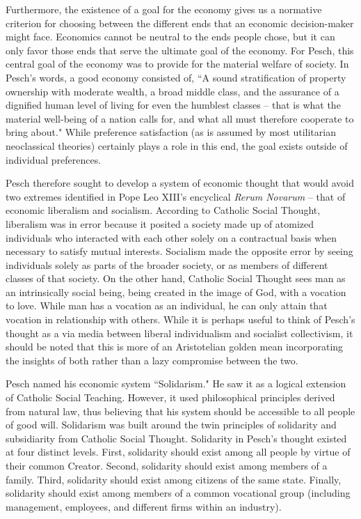 \documentclass{article}
\begin{document}
Furthermore, the existence of a goal for the economy gives us a normative criterion for choosing between the different ends that an economic decision-maker might face.  Economics cannot be neutral to the ends people chose, but it can only favor those ends that serve the ultimate goal of the economy.  For Pesch, this central goal of the economy was to provide for the material welfare of society.  \citep{mulcahy1949}  In Pesch’s words, a good economy consisted of, ``A sound stratification of property ownership with moderate wealth, a broad middle class, and the assurance of a dignified human level of living for even the humblest classes – that is what the material well-being of a nation calls for, and what all must therefore cooperate to bring about." \citep[p. 180]{pesch1998}  While preference satisfaction (as is assumed by most utilitarian neoclassical theories) certainly plays a role in this end, the goal exists outside of individual preferences.\medskip

Pesch therefore sought to develop a system of economic thought that would avoid two extremes identified in Pope Leo XIII’s encyclical \emph{Rerum Novarum} – that of economic liberalism and socialism.  According to Catholic Social Thought, liberalism was in error because it posited a society made up of atomized individuals who interacted with each other solely on a contractual basis when necessary to satisfy mutual interests.  Socialism made the opposite error by seeing individuals solely as parts of the broader society, or as members of different classes of that society. \citep{schuyler1953}  On the other hand, Catholic Social Thought sees man as an intrinsically social being, being created in the image of God, with a vocation to love. \citep[no. 34]{pcjp2004}  While man has a vocation as an individual, he can only attain that vocation in relationship with others.  While it is perhaps useful to think of Pesch’s thought as a via media between liberal individualism and socialist collectivism, it should be noted that this is more of an Aristotelian golden mean incorporating the insights of both rather than a lazy compromise between the two. \citep{koslowski2000}\medskip

Pesch named his economic system ``Solidarism."  He saw it as a logical extension of Catholic Social Teaching.  However, it used philosophical principles derived from natural law, thus believing that his system should be accessible to all people of good will.  Solidarism was built around the twin principles of solidarity and subsidiarity from Catholic Social Thought.  Solidarity in Pesch’s thought existed at four distinct levels.  First, solidarity should exist among all people by virtue of their common Creator.  Second, solidarity should exist among members of a family.  Third, solidarity should exist among citizens of the same state.  Finally, solidarity should exist among members of a common vocational group (including management, employees, and different firms within an industry). \citep[pp. 69-70]{pesch1998}\medskip
\end{document}
